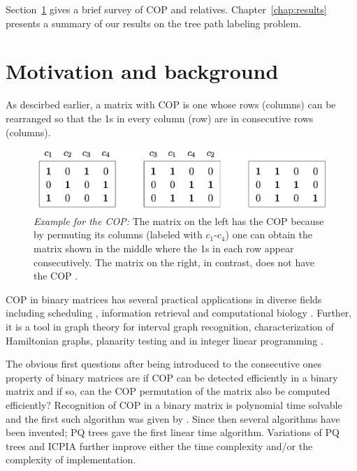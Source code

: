 \documentclass[MS,]{iitmdiss}
\begin{document}
 

Section~\ref{sec:motivation} gives a brief survey of COP and relatives.
Chapter~\ref{chap:results} presents a summary of our results on the
tree path labeling problem.

\section{Motivation and background}
\label{sec:motivation}

As descirbed earlier, a matrix with COP is one whose rows (columns)
can be rearranged so that the 1s in every column (row) are in
consecutive rows (columns).

\begin{figure}[htbp]
  \centering
  \includegraphics[scale=0.4]{../img/0_cop_nocop.png}
  
  \caption{{\em Example for the COP:} The matrix on the left has the
    COP because by permuting its columns (labeled with $c_1$-$c_4$)
    one can obtain the matrix shown in the middle where the 1s in each
    row appear consecutively. The matrix on the right, in contrast,
    does not have the COP \cite{at72,d08phd}.}
  \label{fig:cop-matrix}
\end{figure}

COP in binary matrices has several practical applications in diverse
fields including scheduling \cite{hl06}, information retrieval
\cite{k77} and computational biology \cite{abh98}.  Further, it is a
tool in graph theory \cite{mcg04} for interval graph recognition,
characterization of Hamiltonian graphs, planarity testing \cite{bl76}
and in integer linear programming \cite{ht02,hl06}.


The obvious first questions after being introduced to the consecutive
ones property of binary matrices are if COP can be detected
efficiently in a binary matrix and if so, can the COP permutation of
the matrix also be computed efficiently?  Recognition of COP in a
binary matrix is polynomial time solvable and the first such algorithm
was given by \cite{fg65}.  Since then several algorithms have been
invented; PQ trees \cite{bl76} gave the first linear time
algorithm. Variations of PQ trees \cite{mm96,wlh01,wlh02,mcc04} and
ICPIA \cite{nsnrs09} further improve either the time complexity and/or
the complexity of implementation.
\end{document}
